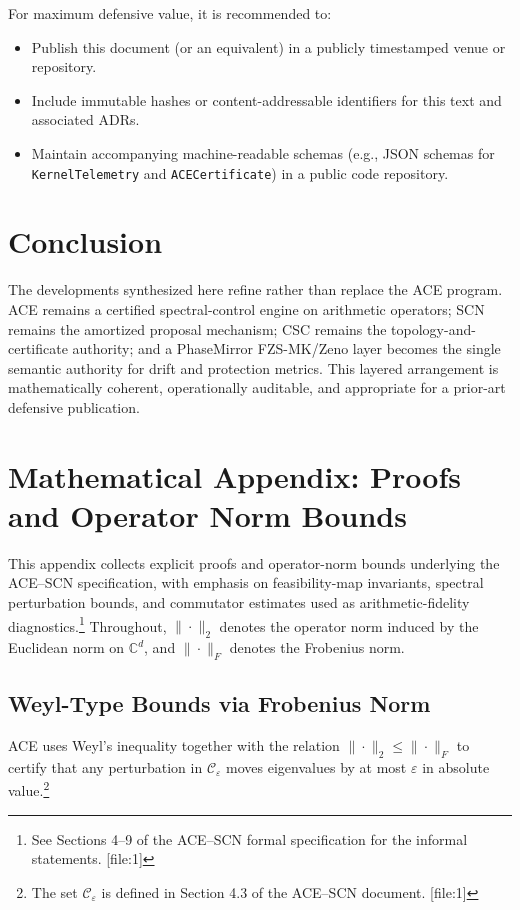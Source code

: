\documentclass[11pt]{article}
\begin{document}
For maximum defensive value, it is recommended to:
\begin{itemize}[leftmargin=*]
  \item Publish this document (or an equivalent) in a publicly timestamped venue or repository.
  \item Include immutable hashes or content-addressable identifiers for this text and associated ADRs.
  \item Maintain accompanying machine-readable schemas (e.g., JSON schemas for \texttt{KernelTelemetry} and \texttt{ACECertificate}) in a public code repository.
\end{itemize}

\section{Conclusion}

The developments synthesized here refine rather than replace the ACE program. ACE remains a certified spectral-control engine on arithmetic operators; SCN remains the amortized proposal mechanism; CSC remains the topology-and-certificate authority; and a PhaseMirror FZS-MK/Zeno layer becomes the single semantic authority for drift and protection metrics. This layered arrangement is mathematically coherent, operationally auditable, and appropriate for a prior-art defensive publication.

\appendix
\section{Mathematical Appendix: Proofs and Operator Norm Bounds}

This appendix collects explicit proofs and operator-norm bounds underlying the ACE--SCN specification, with emphasis on feasibility-map invariants, spectral perturbation bounds, and commutator estimates used as arithmetic-fidelity diagnostics.\footnote{See Sections 4--9 of the ACE--SCN formal specification for the informal statements. [file:1]} Throughout, \( \|\cdot\|_2 \) denotes the operator norm induced by the Euclidean norm on \( \mathbb{C}^d \), and \( \|\cdot\|_F \) denotes the Frobenius norm.

\subsection{Weyl-Type Bounds via Frobenius Norm}

ACE uses Weyl's inequality together with the relation \( \|\cdot\|_2 \le \|\cdot\|_F \) to certify that any perturbation in \( \mathcal{C}_\varepsilon \) moves eigenvalues by at most \( \varepsilon \) in absolute value.\footnote{The set \( \mathcal{C}_\varepsilon \) is defined in Section 4.3 of the ACE--SCN document. [file:1]}
\end{document}
